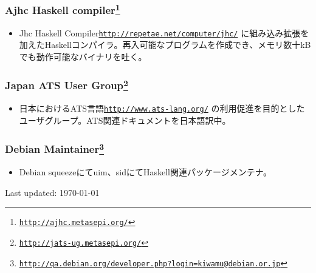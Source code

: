 \documentclass[letterpaper]{article}
\def\footer{
  \begin{center}
    \begin{footnotesize}
      Last updated: \today
    \end{footnotesize}
  \end{center}
}
\begin{document}
\subsubsection*{Ajhc Haskell compiler\footnote{\href{http://ajhc.metasepi.org/}{\tt http://ajhc.metasepi.org/}}}
\begin{itemize}
\item Jhc Haskell Compiler\href{http://repetae.net/computer/jhc/}{\tt http://repetae.net/computer/jhc/} に組み込み拡張を加えたHaskellコンパイラ。再入可能なプログラムを作成でき、メモリ数十kBでも動作可能なバイナリを吐く。
\end{itemize}

\subsubsection*{Japan ATS User Group\footnote{\href{http://jats-ug.metasepi.org/}{\tt http://jats-ug.metasepi.org/}}}
\begin{itemize}
\item 日本におけるATS言語\href{http://www.ats-lang.org/}{\tt http://www.ats-lang.org/} の利用促進を目的としたユーザグループ。ATS関連ドキュメントを日本語訳中。
\end{itemize}

\subsubsection*{Debian Maintainer\footnote{\href{http://qa.debian.org/developer.php?login=kiwamu@debian.or.jp}{\tt http://qa.debian.org/developer.php?login=kiwamu@debian.or.jp}}}
\begin{itemize}
\item Debian squeezeにてuim、sidにてHaskell関連パッケージメンテナ。
\end{itemize}

\bigskip
\footer
\end{document}
